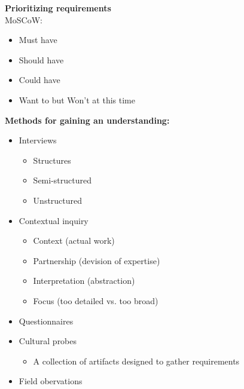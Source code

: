 \textbf{Prioritizing requirements}\\	
MoSCoW:
\begin{itemize}
	\item Must have
	\item Should have
	\item Could have
	\item Want to but Won't at this time
\end{itemize}
\textbf{Methods for gaining an understanding:}
\begin{itemize}
	\item Interviews
	\begin{itemize}
		\item Structures
		\item Semi-structured
		\item Unstructured
	\end{itemize}
	\item Contextual inquiry
	\begin{itemize}
		\item Context (actual work)
		\item Partnership (devision of expertise)
		\item Interpretation (abstraction)
		\item Focus (too detailed vs. too broad)
	\end{itemize}
	\item Questionnaires
	\item Cultural probes
	\begin{itemize}
		\item A collection of artifacts designed to gather requirements
	\end{itemize}
	\item Field obervations
\end{itemize}